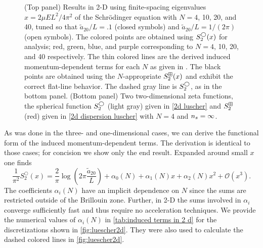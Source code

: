 \begin{figure}
    \center
    
    \caption{
        (Top panel)
        Results in 2-D using finite-spacing eigenvalues $x=2\mu EL^2/4\pi^2$ of the Schr\"odinger equation with $N=4$, 10, 20, and 40, tuned so that $\tilde a_{20}/L=.1$ (closed symbols) and $\tilde a_{20}/L=1/(2\pi)$ (open symbols).
        The colored points are obtained using $S^\bigcirc_2(x)$ for analysis; red, green, blue, and purple corresponding to $N=4$, 10, 20, and 40 respectively.
        The thin colored lines are the derived induced momentum-dependent terms for each $N$ as given in .
        The black points are obtained using the $N$-appropriate $S^{\boxplus}_2(x)$ and exhibit the correct flat-line behavior.
        The dashed gray line is $S_2^\bigcirc$, as in the bottom panel.
        (Bottom panel)
        Two two-dimensional zeta functions, the spherical function $S_2^{\bigcirc}$ (light gray) given in \eqref{2d luscher} and $S_2^{\boxplus}$ (red) given in \eqref{2d dispersion luscher} with $N=4$ and ${n_s}=\infty$.
        }
    \label{fig:luescher2d}
\end{figure}

As was done in the three- and one-dimensional cases, we can derive the functional form of the induced momentum-dependent terms.
The derivation is identical to those cases; for concision we show only the end result.
Expanded around small $x$ one finds
\begin{equation}
    \label{eq:2D corrections}
    \frac{1}{ \pi^{2}} S^\bigcirc_{2}\left(x\right)
    =
    \frac{2}{\pi}\log\left(2\pi \frac{\tilde a_{20}}{L}\right)
    + \alpha_0(N)
    + \alpha_1(N) x
    + \alpha_2(N) x^2
    + \mathcal{O}(x^3).
\end{equation}
The coefficients $\alpha_i(N)$ have an implicit dependence on $N$ since the sums are restricted outside of the Brillouin zone.  Further, in 2-D the sums involved in $\alpha_i$ converge sufficiently fast and thus require no acceleration techniques.  We provide the numerical values of $\alpha_i(N)$ in \autoref{tab:induced terms in 2 d} for the discretizations shown in \autoref{fig:luescher2d}.  They were also used to calculate the dashed colored lines in \autoref{fig:luescher2d}.

